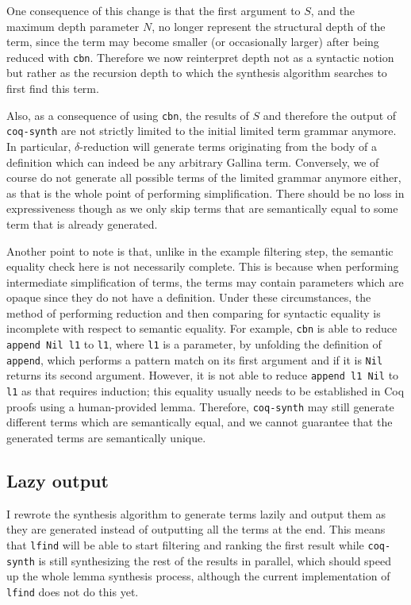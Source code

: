\documentclass[11pt]{article}
\newcommand{\coq}[1]{\texttt{#1}}
\begin{document}
One consequence of this change is that the first argument to $S$, and the maximum depth parameter $N$, no longer represent the structural depth of the term, since the term may become smaller (or occasionally larger) after being reduced with \coq{cbn}. Therefore we now reinterpret depth not as a syntactic notion but rather as the recursion depth to which the synthesis algorithm searches to first find this term.

Also, as a consequence of using \coq{cbn}, the results of $S$ and therefore the output of \texttt{coq-synth} are not strictly limited to the initial limited term grammar anymore. In particular, $\delta$-reduction will generate terms originating from the body of a definition which can indeed be any arbitrary Gallina term. Conversely, we of course do not generate all possible terms of the limited grammar anymore either, as that is the whole point of performing simplification. There should be no loss in expressiveness though as we only skip terms that are semantically equal to some term that is already generated.

Another point to note is that, unlike in the example filtering step, the semantic equality check here is not necessarily complete. This is because when performing intermediate simplification of terms, the terms may contain parameters which are opaque since they do not have a definition. Under these circumstances, the method of performing reduction and then comparing for syntactic equality is incomplete with respect to semantic equality. For example, \coq{cbn} is able to reduce \coq{append Nil l1} to \coq{l1}, where \coq{l1} is a parameter, by unfolding the definition of \coq{append}, which performs a pattern match on its first argument and if it is \coq{Nil} returns its second argument. However, it is not able to reduce \coq{append l1 Nil} to \coq{l1} as that requires induction; this equality usually needs to be established in Coq proofs using a human-provided lemma. Therefore, \texttt{coq-synth} may still generate different terms which are semantically equal, and we cannot guarantee that the generated terms are semantically unique.

\subsection{Lazy output}

I rewrote the synthesis algorithm to generate terms lazily and output them as they are generated instead of outputting all the terms at the end. This means that \texttt{lfind} will be able to start filtering and ranking the first result while \texttt{coq-synth} is still synthesizing the rest of the results in parallel, which should speed up the whole lemma synthesis process, although the current implementation of \texttt{lfind} does not do this yet.
\end{document}
